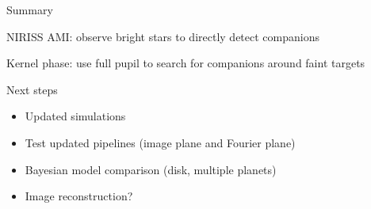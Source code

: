 \documentclass[10pt]{beamer}
\newenvironment{wideitemize}{\itemize\addtolength{\itemsep}{10pt}}{\enditemize}
\begin{document}

\begin{frame}{Summary}
  \begin{wideitemize}
    \item NIRISS AMI: observe bright stars to directly detect companions
    \item Kernel phase: use full pupil to search for companions around faint targets
    \item Next steps
    \begin{itemize}
      \item Updated simulations
      \item Test updated pipelines (image plane and Fourier plane)
      \item Bayesian model comparison (disk, multiple planets)
      \item Image reconstruction?
    \end{itemize}
  \end{wideitemize}
\end{frame}
\end{document}
